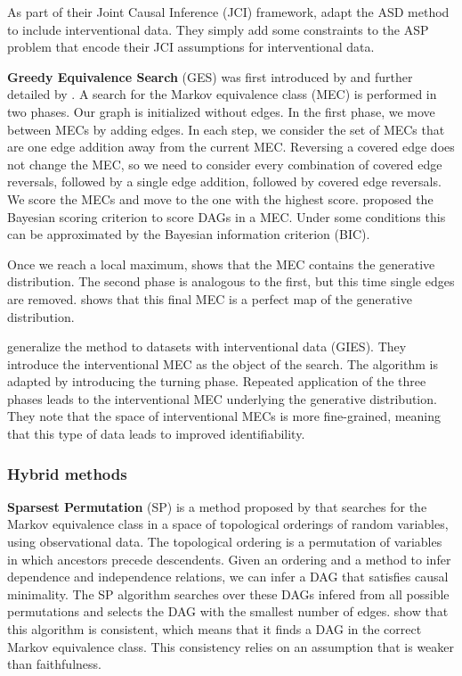 As part of their Joint Causal Inference (JCI) framework, \citet{mooij2016joint} adapt the ASD method to include interventional data. They simply add some constraints to the ASP problem that encode their JCI assumptions for interventional data.

\textbf{Greedy Equivalence Search} (GES) was first introduced by \citet{meek1997graphical} and further detailed by \citet{chickering2002optimal}. A search for the Markov equivalence class (MEC) is performed in two phases. Our graph is initialized without edges. In the first phase, we move between MECs by adding edges. In each step, we consider the set of MECs that are one edge addition away from the current MEC. Reversing a covered edge does not change the MEC, so we need to consider every combination of covered edge reversals, followed by a single edge addition, followed by covered edge reversals. We score the MECs and move to the one with the highest score. \citet{meek1997graphical} proposed the Bayesian scoring criterion to score DAGs in a MEC. Under some conditions this can be approximated by the Bayesian information criterion (BIC). 

Once we reach a local maximum, \citet{chickering2002optimal} shows that the MEC contains the generative distribution. The second phase is analogous to the first, but this time single edges are removed. \citet{chickering2002optimal} shows that this final MEC is a perfect map of the generative distribution.

\citet{hauser2012characterization} generalize the method to datasets with interventional data (GIES). They introduce the interventional MEC as the object of the search. The algorithm is adapted by introducing the turning phase. Repeated application of the three phases leads to the interventional MEC underlying the generative distribution. They note that the space of interventional MECs is more fine-grained, meaning that this type of data leads to improved identifiability.


\subsubsection{Hybrid methods}

\textbf{Sparsest Permutation} (SP) is a method proposed by \citet{raskutti2018learning} that searches for the Markov equivalence class in a space of topological orderings of random variables, using observational data. The topological ordering is a permutation of variables in which ancestors precede descendents. Given an ordering and a method to infer dependence and independence relations, we can infer a DAG that satisfies causal minimality. The SP algorithm searches over these DAGs infered from all possible permutations and selects the DAG with the smallest number of edges. \citet{raskutti2018learning} show that this algorithm is consistent, which means that it finds a DAG in the correct Markov equivalence class. This consistency relies on an assumption that is weaker than faithfulness. 

